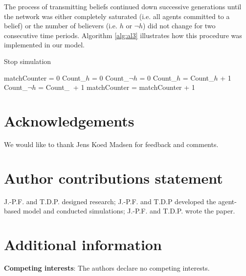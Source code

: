 \documentclass[fleqn,10pt]{wlscirep}
\begin{document}
The process of transmitting beliefs continued down successive generations until the network was either completely saturated (i.e. all agents committed to a belief) or the number of believers (i.e. \(h\) or \(\neg h\)) did not change for two consecutive time periods. Algorithm \ref{alg:al3} illustrates how this procedure was implemented in our model.

\begin{algorithm}[H]
\caption{Stop simulation}\label{proceed}
\begin{algorithmic}[1]
    \State matchCounter = 0 
    \State Count_{\(h\)} = 0
     \label{alg:al3}
    \State Count_{\(\neg h\)} = 0
            \State Count_{\(h\)} = Count_{\(h\)} + 1
        \EndIf
            \State Count_{\(\neg h\)} = Count_{\(\ \)} + 1
        \EndIf
    \EndFor
        \State matchCounter = matchCounter + 1
    \EndIf
  \EndProcedure
\end{algorithmic}
\end{algorithm}





\section*{Acknowledgements}
We would like to thank Jens Koed Madsen for feedback and comments. 

\section*{Author contributions statement}
J.-P.F. and T.D.P. designed research; J.-P.F. and T.D.P developed the agent-based model and conducted simulations; J.-P.F. and T.D.P. wrote the paper.

\section*{Additional information}

\textbf{Competing interests}: The authors declare no competing interests. 

\end{document}
